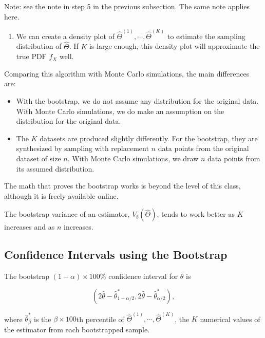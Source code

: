 \documentclass[
]{book}
\providecommand{\tightlist}{%
  \setlength{\itemsep}{0pt}\setlength{\parskip}{0pt}}
\begin{document}
Note: see the note in step 5 in the previous subsection. The same note applies here.

\begin{enumerate}
\def\labelenumi{\arabic{enumi}.}
\setcounter{enumi}{4}
\tightlist
\item
  We can create a density plot of \(\hat{\Theta}^{(1)}, \cdots, \hat{\Theta}^{(K)}\) to estimate the sampling distribution of \(\hat{\Theta}\). If \(K\) is large enough, this density plot will approximate the true PDF \(f_X\) well.
\end{enumerate}

Comparing this algorithm with Monte Carlo simulations, the main differences are:

\begin{itemize}
\item
  With the bootstrap, we do not assume any distribution for the original data. With Monte Carlo simulations, we do make an assumption on the distribution for the original data.
\item
  The \(K\) datasets are produced slightly differently. For the bootstrap, they are synthesized by sampling with replacement \(n\) data points from the original dataset of size \(n\). With Monte Carlo simulations, we draw \(n\) data points from its assumed distribution.
\end{itemize}

The math that proves the bootstrap works is beyond the level of this class, although it is freely available online.

The bootstrap variance of an estimator, \(V_b(\hat{\Theta})\), tends to work better as \(K\) increases and as \(n\) increases.

\hypertarget{confidence-intervals-using-the-bootstrap}{%
\subsection{Confidence Intervals using the Bootstrap}\label{confidence-intervals-using-the-bootstrap}}

The bootstrap \((1-\alpha) \times 100\%\) confidence interval for \(\theta\) is

\begin{equation} 
\left( 2 \hat{\theta} - \hat{\theta}_{1-\alpha/2}^*, 2 \hat{\theta} - \hat{\theta}_{\alpha/2}^* \right), 
\label{eq:8-CIboot}
\end{equation}

where \(\hat{\theta}_{\beta}^*\) is the \(\beta \times 100\)th percentile of \(\hat{\Theta}^{(1)}, \cdots, \hat{\Theta}^{(K)}\), the \(K\) numerical values of the estimator from each bootstrapped sample.
\end{document}
